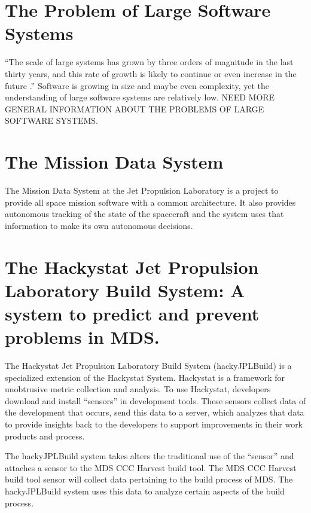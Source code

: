 \section{The Problem of Large Software Systems}
``The scale of large systems has grown by three orders of magnitude in the
last thirty years, and this rate of growth is likely to continue or even
increase in the future \cite{humphrey_1985}.''  Software is growing in size and
maybe even complexity, yet the understanding of large software systems are
relatively low.  NEED MORE GENERAL INFORMATION ABOUT THE PROBLEMS OF LARGE
SOFTWARE SYSTEMS.




\section{The Mission Data System}
The Mission Data System at the Jet Propulsion Laboratory is a project to
provide all space mission software with a common architecture.  It also
provides autonomous tracking of the state of the spacecraft and the system
uses that information to make its own autonomous decisions. \cite{x2000mds}




\section{The Hackystat Jet Propulsion Laboratory Build System: A system to
predict and prevent problems in MDS.}
The Hackystat Jet Propulsion Laboratory Build System (hackyJPLBuild) is a
specialized extension of the Hackystat System.  Hackystat is a framework
for unobtrusive metric collection and analysis.  To use Hackystat,
developers download and install ``sensors'' in development tools.  These
sensors collect data of the development that occurs, send this data to a
server, which analyzes that data to provide insights back to the developers 
to support improvements in their work products and process.

The hackyJPLBuild system takes alters the traditional use of the ``sensor'' 
and attaches a sensor to the MDS CCC Harvest build tool.  The MDS CCC
Harvest build tool sensor will collect data pertaining to the build process 
of MDS.  The hackyJPLBuild system uses this data to analyze certain aspects 
of the build process.

